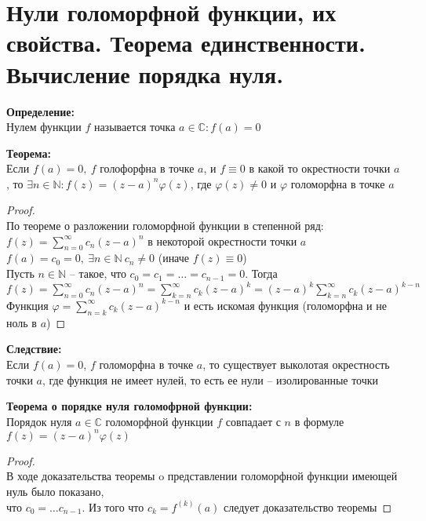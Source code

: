 \newpage
\section{Нули голоморфной функции, их свойства. Теорема единственности. Вычисление порядка нуля.}

\textbf{Определение:}\\[2mm]
Нулем функции $f$ называется точка $a \in \mathbb{C}: f(a) = 0$


\textbf{Теорема:}\\[2mm]
Если $f(a) = 0, \ f$ голофорфна в точке $a$, и $f \equiv 0$ в какой то окрестности точки $a$,
то $\exists n \in \mathbb{N}: f(z) = (z - a)^n\varphi(z)$, где $\varphi(z) \neq 0$ и $\varphi$ голоморфна в точке $a$


\begin{proof}
    \ \\
    По теореме о разложении голоморфной функции в степенной ряд:\\[2mm]
    $f(z) = \sum_{n=0}^{\infty} c_n (z-a)^n$ в некоторой окрестности точки $a$\\[2mm]
    $f(a) = c_0 = 0, \ \exists n \in \mathbb{N} \ c_n \neq 0$ (иначе $f(z) \equiv 0$)\\[2mm]
    Пусть $n \in \mathbb{N}$ -- такое, что $c_0 = c_1 = \dots = c_{n-1} = 0$. Тогда \\[2mm]
    $f(z) = \sum_{n=0}^{\infty}c_n (z-a)^n = \sum_{k=n}^{\infty}c_k(z-a)^k = (z-a)^k\sum_{k=n}^{\infty}c_k(z-a)^{k-n}$\\[2mm]
    Функция $\varphi = \sum_{n=k}^{\infty}c_k(z-a)^{k-n}$ и есть искомая функция (голоморфна и не ноль в $a$)
\end{proof}


\textbf{Следствие:}\\[2mm]
Если $f(a) = 0$, $f$ голоморфна в точке $a$, то
существует выколотая окрестность точки $a$, где функция не имеет нулей,
то есть ее нули -- изолированные точки


\textbf{Теорема о порядке нуля голомофрной функции:}\\[2mm]
Порядок нуля $a \in \mathbb{C}$ голоморфной функции $f$ 
совпадает с $n$ в формуле $f(z) = (z-a)^n\varphi(z)$


\begin{proof}
    \ \\
    В ходе доказательства теоремы o представлении
    голоморфной функции имеющей нуль было показано,\\[2mm] 
    что $c_0 = \dots c_{n-1}$. Из того что $c_k = f^{(k)}(a)$ 
    следует доказательство теоремы
\end{proof}


